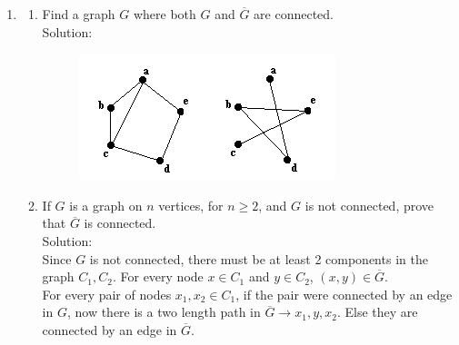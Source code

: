 \documentclass[a4paper]{article}
\begin{document}
\begin{enumerate}
\item
\begin{enumerate}
\item Find a graph $G$ where both $G$ and $\overline{G}$ are connected.\\
Solution:\\
\begin{figure}[h]
\centering
\includegraphics[scale=0.5]{complement.png}
\end{figure}

\item If $G$ is a graph on $n$ vertices, for $n \geq 2$, and $G$ is not connected, prove that $\overline{G}$ is connected.\\
Solution: \\
Since $G$ is not connected, there must be at least 2 components in the graph $C_1,C_2$. For every node $x \in C_1$ and $y \in C_2$, 
$(x,y) \in \overline{G}$. \\
For every pair of nodes $x_1,x_2 \in C_1$, if the pair were connected by an edge in $G$, now there is a two length path in $\overline{G} \rightarrow x_1,y,x_2$. Else they are connected by an edge in $\overline{G}$. \\
 
\end{enumerate}


\end{enumerate}
\end{document}
